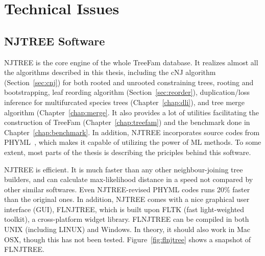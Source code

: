 \chapter{Technical Issues}

\section{NJTREE Software}

NJTREE is the core engine of the whole TreeFam database. It realizes
almost all the algorithms described in this thesis, including
the cNJ algorithm (Section~\ref{sec:cnj}) for both rooted and unrooted constraining trees,
rooting and bootstrapping,
leaf reording algorithm (Section~\ref{sec:reorder}),
duplication/loss inference for multifurcated species trees (Chapter~\ref{chap:dli}),
and tree merge algorithm (Chapter~\ref{chap:merge}.
It also provides a lot of utilities facilitating the construction of TreeFam (Chapter~\ref{chap:treefam})
and the benchmark done in Chapter~\ref{chap:benchmark}.
In addition, NJTREE incorporates source codes from PHYML~\cite{guindon03},
which makes it capable of utilizing the power of ML methods.
To some extent, most parts of the thesis is describing the priciples behind this software.

NJTREE is efficient. It is much faster than any other neighbour-joining tree builders,
and can calculate max-likelihood distance in a speed not compared by other
similar softwares. Even NJTREE-revised PHYML codes runs 20\% faster than the original ones.
In addition, NJTREE comes with a nice graphical user interface (GUI), FLNJTREE, which is built upon
FLTK (fast light-weighted toolkit), a cross-platform widget library. FLNJTREE
can be compiled in both UNIX (including LINUX) and Windows. In theory, it should also work in Mac OSX, though this
has not been tested. Figure~\ref{fig:flnjtree} shows a snapshot of FLNJTREE.

